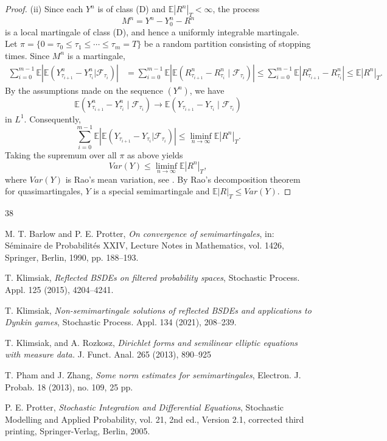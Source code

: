 \documentclass[11pt,a4paper,reqno]{amsart}
\theoremstyle{definition}
\numberwithin{equation}{section}
\begin{document}
\begin{proof}
(ii) Since each $Y^n$ is of class (D) and $\mathbb E|R^n|_T<\infty$, the process
\[
M^n=Y^n-Y^n_0-R^n
\]
is a local martingale of class (D), and hence a uniformly integrable
martingale.
Let  $\pi=\{0=\tau_0\leq\tau_1\leq\cdots\leq\tau_m=T\}$
be  a random partition consisting of stopping times.
Since $M^n$ is a martingale,
\[
\begin{split}
\sum_{i=0}^{m-1}
\mathbb E\left|
\mathbb E\left(
Y^n_{\tau_{i+1}}-Y^n_{\tau_i}
|\mathcal F_{\tau_i}
\right)
\right|&=
\sum_{i=0}^{m-1}
\mathbb E\left|
\mathbb E\left(
R^n_{\tau_{i+1}}-R^n_{\tau_i}
\mid\mathcal F_{\tau_i}
\right)
\right|\leq
\sum_{i=0}^{m-1}
\mathbb E
\left|R^n_{\tau_{i+1}}-R^n_{\tau_i}\right|
\leq
\mathbb E|R^n|_T.
\end{split}
\]
By the assumptions made on the sequence $(Y^n)$, we have 
\[
\mathbb E\left(
Y^n_{\tau_{i+1}}-Y^n_{\tau_i}
\mid\mathcal F_{\tau_i}
\right)
\longrightarrow
\mathbb E\left(
Y_{\tau_{i+1}}-Y_{\tau_i}
\mid\mathcal F_{\tau_i}
\right)
\]
in $L^1$. Consequently,
\[
\sum_{i=0}^{m-1}\mathbb E\left|\mathbb E\left(Y_{\tau_{i+1}}-Y_{\tau_i}|\mathcal F_{\tau_i}\right)\right|\leq
\liminf_{n\to\infty}\mathbb E|R^n|_T.
\]
Taking the supremum over all $\pi$ as above yields
\[
Var(Y)
\leq
\liminf_{n\to\infty}\mathbb E|R^n|_T,
\]
where $Var(Y)$ is  Rao's mean variation, see \cite[Section III.4]{Protter}.
By Rao's decomposition theorem for quasimartingales, $Y$ is
a special semimartingale and $\mathbb E|R|_T\leq Var(Y)$.
\end{proof}


\begin{thebibliography}{38}

M. T. Barlow and P. E. Protter,
\emph{On convergence of semimartingales},
in: S\'eminaire de Probabilit\'es XXIV,
Lecture Notes in Mathematics, vol. 1426,
Springer, Berlin, 1990, pp. 188--193.

T. Klimsiak,
\emph{Reflected BSDEs on filtered probability spaces},
Stochastic Process. Appl. 125 (2015), 4204--4241.

T. Klimsiak, \emph{ Non-semimartingale solutions of reflected BSDEs and applications to Dynkin games},
Stochastic Process. Appl. 134  (2021), 208--239. 

T. Klimsiak, and A. Rozkosz, 
\emph{Dirichlet forms and semilinear elliptic equations with measure data.}
J. Funct. Anal. 265 (2013), 890--925

T. Pham and J. Zhang,
\emph{Some norm estimates for semimartingales},
Electron. J. Probab. 18 (2013), no. 109, 25 pp.

P. E. Protter,
\emph{Stochastic Integration and Differential Equations},
Stochastic Modelling and Applied Probability, vol. 21,
2nd ed., Version 2.1, corrected third printing,
Springer-Verlag, Berlin, 2005.

\end{thebibliography}
\end{document}
